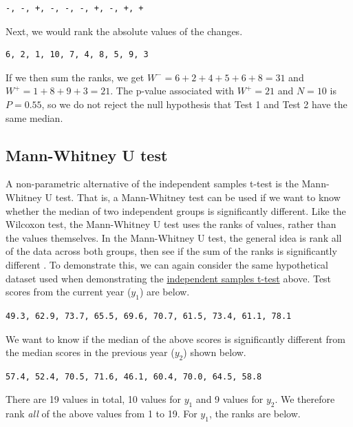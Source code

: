 \documentclass[
]{scrbook}
\begin{document}
\begin{verbatim}
-, -, +, -, -, -, +, -, +, +
\end{verbatim}

Next, we would rank the absolute values of the changes.

\begin{verbatim}
6, 2, 1, 10, 7, 4, 8, 5, 9, 3
\end{verbatim}

If we then sum the ranks, we get \(W^{-} = 6 + 2 + 4 + 5 + 6 + 8 = 31\) and \(W^{+} = 1 + 8 + 9 + 3 = 21\).
The p-value associated with \(W^{+} = 21\) and \(N = 10\) is \(P = 0.55\), so we do not reject the null hypothesis that Test 1 and Test 2 have the same median.

\hypertarget{mann-whitney-u-test}{%
\subsection{Mann-Whitney U test}\label{mann-whitney-u-test}}

A non-parametric alternative of the independent samples t-test is the Mann-Whitney U test.
That is, a Mann-Whitney test can be used if we want to know whether the median of two independent groups is significantly different.
Like the Wilcoxon test, the Mann-Whitney U test uses the ranks of values, rather than the values themselves.
In the Mann-Whitney U test, the general idea is rank all of the data across both groups, then see if the sum of the ranks is significantly different \citep{Sokal1995}.
To demonstrate this, we can again consider the same hypothetical dataset used when demonstrating the \protect\hyperlink{independent-samples-t-test}{independent samples t-test} above.
Test scores from the current year (\(y_{1}\)) are below.

\begin{verbatim}
49.3, 62.9, 73.7, 65.5, 69.6, 70.7, 61.5, 73.4, 61.1, 78.1
\end{verbatim}

We want to know if the median of the above scores is significantly different from the median scores in the previous year (\(y_{2}\)) shown below.

\begin{verbatim}
57.4, 52.4, 70.5, 71.6, 46.1, 60.4, 70.0, 64.5, 58.8
\end{verbatim}

There are 19 values in total, 10 values for \(y_{1}\) and 9 values for \(y_{2}\).
We therefore rank \emph{all} of the above values from 1 to 19.
For \(y_{1}\), the ranks are below.
\end{document}
